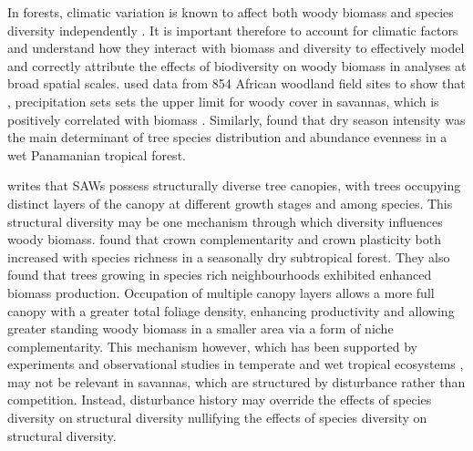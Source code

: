 \documentclass[11pt,a4paper]{article}
\newcommand{\textapprox}{\raisebox{0.5ex}{\texttildelow}}  %
\begin{document}



In forests, climatic variation is known to affect both woody biomass \citep{Michaletz2014, Michaletz2018} and species diversity independently \citep{Spasojevic2014}. It is important therefore to account for climatic factors and understand how they interact with biomass and diversity to effectively model and correctly attribute the effects of biodiversity on woody biomass in analyses at broad spatial scales. \citet{Sankaran2005} used data from 854 African woodland field sites to show that \rnew{below a threshold of \textapprox{}650 mm MAP}, precipitation sets sets the upper limit for woody cover in savannas, which is positively correlated with biomass \citep{Chisholm2013, Prado-Junior2016}. Similarly, \citet{Condit2013} found that dry season intensity was the main determinant of tree species distribution and abundance evenness in a wet Panamanian tropical forest.

\citet{Solbrig1996} writes that SAWs possess structurally diverse tree canopies, with trees occupying distinct layers of the canopy at different growth stages and among species. This structural diversity may be one mechanism through which diversity influences woody biomass. \citet{Kunz2019} found that crown complementarity and crown plasticity both increased with species richness in a seasonally dry subtropical forest. They also found that trees growing in species rich neighbourhoods exhibited enhanced biomass production. Occupation of multiple canopy layers allows a more full canopy with a greater total foliage density, enhancing productivity and allowing greater standing woody biomass in a smaller area via a form of niche complementarity. This mechanism however, which has been supported by experiments and observational studies in temperate and wet tropical ecosystems \citep{Hardiman2011, Stark2012}, may not be relevant in savannas, which are structured by disturbance rather than competition. Instead, disturbance history may override the effects of species diversity on structural diversity nullifying the effects of species diversity on structural diversity. 
\end{document}
